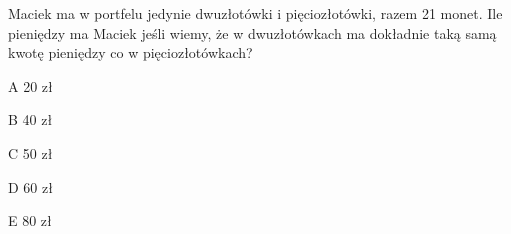 \begin{tresc}
Maciek ma w portfelu jedynie dwuzłotówki i pięciozłotówki, razem 21 monet. Ile pieniędzy ma Maciek jeśli wiemy, że w dwuzłotówkach ma dokładnie taką samą kwotę pieniędzy co w pięciozłotówkach?
\end{tresc}
\begin{wariant}{A} 20 zł \end{wariant}
\begin{wariant}{B} 40 zł \end{wariant}
\begin{wariant}{C} 50 zł \end{wariant}
\begin{wariant}{D} 60 zł \end{wariant}
\begin{wariant}{E} 80 zł \end{wariant}
